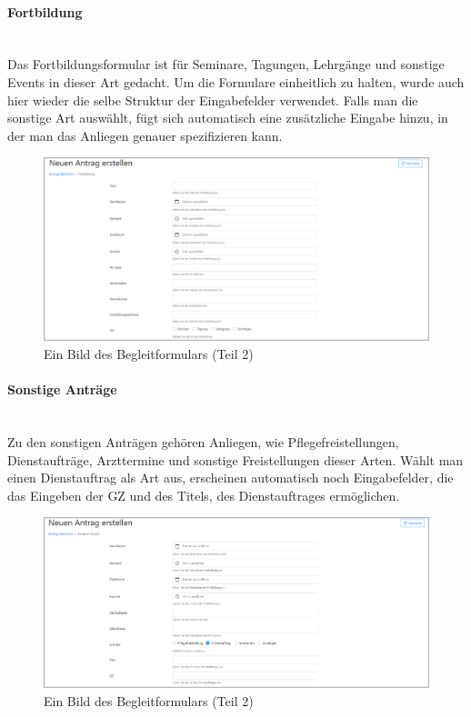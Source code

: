 \paragraph{Fortbildung}
~\\
Das Fortbildungsformular ist für Seminare, Tagungen, Lehrgänge und sonstige Events in dieser Art gedacht. Um die Formulare einheitlich zu halten, wurde auch hier wieder die selbe Struktur der Eingabefelder verwendet. Falls man die sonstige Art auswählt, fügt sich automatisch eine zusätzliche Eingabe hinzu, in der man das Anliegen genauer spezifizieren kann.
\begin{figure}[H]
	\centering
	\includegraphics[width=1\linewidth]{images/website/fortbildung_1}
	\caption[Neuer Schulantrag]{Ein Bild des Begleitformulars (Teil 2)}
	\label{fig:frotbildung}
\end{figure}

\paragraph{Sonstige Anträge}
~\\
Zu den sonstigen Anträgen gehören Anliegen, wie Pflegefreistellungen, Dienstaufträge, Arzttermine und sonstige Freistellungen dieser Arten. Wählt man einen Dienstauftrag als Art aus, erscheinen automatisch noch Eingabefelder, die das Eingeben der GZ und des Titels, des Dienstauftrages ermöglichen.
\begin{figure}[H]
	\centering
	\includegraphics[width=1\linewidth]{images/website/dienstauftrag}
	\caption[Neuer Schulantrag]{Ein Bild des Begleitformulars (Teil 2)}
	\label{fig:dienst}
\end{figure}

